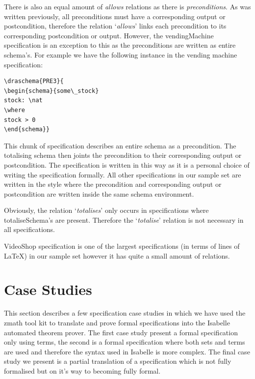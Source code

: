 There is also an equal amount of \emph{allows} relations as there is \emph{preconditions}. As was written previously, all preconditions must have a corresponding output or postcondition, therefore the relation `\emph{allows}' links each precondition to its corresponding postcondition or output. However, the vendingMachine specification is an exception to this as the preconditions are written as entire schema's. For example we have the following instance in the vending machine specification:

\begin{verbatim}
\draschema{PRE3}{
\begin{schema}{some\_stock}
stock: \nat
\where
stock > 0
\end{schema}}
\end{verbatim}

This chunk of specification describes an entire schema as a precondition. The totalising schema then joints the precondition to their corresponding output or postcondition. The specification is written in this way as it is a personal choice of writing the specification formally. All other specifications in our sample set are written in the style where the precondition and corresponding output or postcondition are written inside the same schema environment.

Obviously, the relation `\emph{totalises}' only occurs in specifications where totaliseSchema's are present. Therefore the `\emph{totalise}' relation is not necessary in all specifications.

VideoShop specification is one of the largest specifications (in terms of lines of \LaTeX{}) in our sample set however it has quite a small amount of relations.

\section{Case Studies}

This section describes a few specification case studies in which we have used the \gls{zmath} tool kit to translate and prove formal specifications into the Isabelle automated theorem prover. The first case study present a formal specification only using terms, the second is a formal specification where both sets and terms are used and therefore the syntax used in Isabelle is more complex. The final case study we present is a partial translation of a specification which is not fully formalised but on it's way to becoming fully formal.

